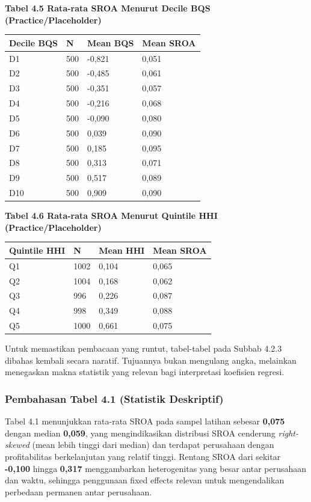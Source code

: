 \documentclass[12pt,a4paper]{report}
\begin{document}
\textbf{Tabel 4.5 Rata-rata SROA Menurut Decile BQS
(Practice/Placeholder)}

\begin{longtable}[]{@{}llll@{}}
\toprule
Decile BQS & N & Mean BQS & Mean SROA \\
\midrule
\endhead
D1 & 500 & -0,821 & 0,051 \\
D2 & 500 & -0,485 & 0,061 \\
D3 & 500 & -0,351 & 0,057 \\
D4 & 500 & -0,216 & 0,068 \\
D5 & 500 & -0,090 & 0,080 \\
D6 & 500 & 0,039 & 0,090 \\
D7 & 500 & 0,185 & 0,095 \\
D8 & 500 & 0,313 & 0,071 \\
D9 & 500 & 0,517 & 0,089 \\
D10 & 500 & 0,909 & 0,090 \\
\bottomrule
\end{longtable}

\textbf{Tabel 4.6 Rata-rata SROA Menurut Quintile HHI
(Practice/Placeholder)}

\begin{longtable}[]{@{}llll@{}}
\toprule
Quintile HHI & N & Mean HHI & Mean SROA \\
\midrule
\endhead
Q1 & 1002 & 0,104 & 0,065 \\
Q2 & 1004 & 0,168 & 0,062 \\
Q3 & 996 & 0,226 & 0,087 \\
Q4 & 998 & 0,349 & 0,088 \\
Q5 & 1000 & 0,661 & 0,075 \\
\bottomrule
\end{longtable}

Untuk memastikan pembacaan yang runtut, tabel-tabel pada Subbab 4.2.3
dibahas kembali secara naratif. Tujuannya bukan mengulang angka,
melainkan menegaskan makna statistik yang relevan bagi interpretasi
koefisien regresi.

\hypertarget{pembahasan-tabel-4.1-statistik-deskriptif}{%
\subsubsection{Pembahasan Tabel 4.1 (Statistik
Deskriptif)}\label{pembahasan-tabel-4.1-statistik-deskriptif}}

Tabel 4.1 menunjukkan rata-rata SROA pada sampel latihan sebesar
\textbf{0,075} dengan median \textbf{0,059}, yang mengindikasikan
distribusi SROA cenderung \emph{right-skewed} (mean lebih tinggi dari
median) dan terdapat perusahaan dengan profitabilitas berkelanjutan yang
relatif tinggi. Rentang SROA dari sekitar \textbf{-0,100} hingga
\textbf{0,317} menggambarkan heterogenitas yang besar antar perusahaan
dan waktu, sehingga penggunaan fixed effects relevan untuk mengendalikan
perbedaan permanen antar perusahaan.
\end{document}
